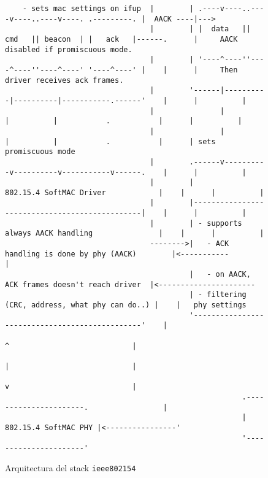 \begin{figure}
{\begin{verbatim}
    - sets mac settings on ifup  |        | .----v----..----v----..----v----. .---------. |  AACK ----|--->                                   
                                 |        | |  data   ||   cmd   || beacon  | |   ack   |------.      |     AACK disabled if promiscuous mode.
                                 |        | '----^----''----^----''----^----' '----^----' |    |      |     Then driver receives ack frames.  
                                 |        '------|----------|----------|-----------.------'    |      |          |
                                 |               |          |          |           .           |      |          |
                                 |               |          |          |           .           |      | sets promiscuous mode
                                 |        .------v----------v----------v-----------v------.    |      |          |
                                 |        |            802.15.4 SoftMAC Driver            |    |      |          |
                                 |        |-----------------------------------------------|    |      |          |
                                 |        | - supports always AACK handling               |    |      |          |
                                 -------->|   - ACK handling is done by phy (AACK)        |<-----------          |
                                          |   - on AACK, ACK frames doesn't reach driver  |<----------------------
                                          | - filtering (CRC, address, what phy can do..) |    |   phy settings
                                          '-----------------------------------------------'    |
                                                                  ^                            |
                                                                  |                            |
                                                                  v                            |
                                                      .----------------------.                 |
                                                      | 802.15.4 SoftMAC PHY |<----------------'
                                                      '----------------------'
\end{verbatim}
}
\caption{Arquitectura del stack \texttt{ieee802154} \cite{wpanArch}}
\label{fig:arch_ieee802154}
\end{figure}
